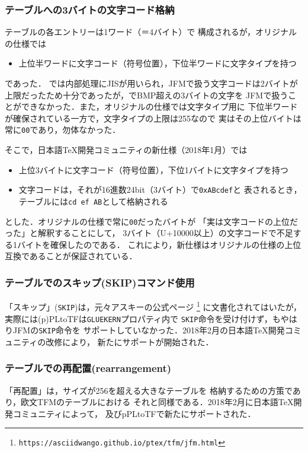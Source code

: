 \documentclass[a4paper,11pt,nomag]{jsarticle}
\def\code#1{\texttt{#1}}
\begin{document}
\subsubsection{テーブルへの3バイトの文字コード格納}
テーブルの各エントリーは1ワード（＝4バイト）で
構成されるが，オリジナルの仕様では
\begin{itemize}
  \item 上位半ワードに文字コード（符号位置），下位半ワードに文字タイプを持つ
\end{itemize}
であった．
\pTeX{}では内部処理にJISが用いられ，JFMで扱う文字コードは2バイトが
上限だったため十分であったが，\upTeX{}でBMP超えの3バイトの文字を
JFMで扱うことができなかった．また，オリジナルの仕様では文字タイプ用に
下位半ワードが確保されている一方で，文字タイプの上限は255なので
実はその上位バイトは常に\code{00}であり，勿体なかった．

そこで，日本語\TeX{}開発コミュニティの新仕様（2018年1月）では
\begin{itemize}
  \item 上位3バイトに文字コード（符号位置），下位1バイトに文字タイプを持つ
  \item 文字コードは，それが16進数24bit（3バイト）で\code{0xABcdef}と
    表されるとき，テーブルには\code{cd ef AB}として格納される
\end{itemize}
とした．オリジナルの仕様で常に\code{00}だったバイトが
「実は文字コードの上位だった」と解釈することにして，
3バイト（U+10000以上）の文字コードで不足する1バイトを確保したのである．
これにより，新仕様はオリジナルの仕様の上位互換であることが保証されている．

\subsubsection{テーブルでのスキップ(SKIP)コマンド使用}
「スキップ」(\code{SKIP})は，元々アスキーの公式ページ
\footnote{\texttt{https://asciidwango.github.io/ptex/tfm/jfm.html}}
に文書化されてはいたが，実際には(p)PLtoTFは\code{GLUEKERN}プロパティ内で
\code{SKIP}命令を受け付けず，\pTeX{}もやはりJFMの\code{SKIP}命令を
サポートしていなかった．2018年2月の日本語\TeX{}開発コミュニティの改修により，
新たにサポートが開始された．

\subsubsection{テーブルでの再配置(rearrangement)}
「再配置」は，サイズが256を超える大きなテーブルを
格納するための方策であり，欧文TFMのテーブルにおける
それと同様である．2018年2月に日本語\TeX{}開発コミュニティによって，
\pTeX{}及びpPLtoTFで新たにサポートされた．
\end{document}
